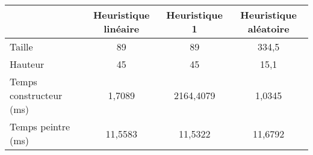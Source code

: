 \begin{center}
{\tabulinesep=1.2mm
\begin{tabu}{|l|c|c|c|}
  \hline
  & Heuristique linéaire  & Heuristique 1 & Heuristique aléatoire \\ 
  \hline
  Taille &        89&        89&     334,5  \\ 
  \hline
  Hauteur &        45&        45&      15,1  \\ 
  \hline
  Temps constructeur (ms) &          1,7089&       2164,4079&          1,0345  \\ 
  \hline
  Temps peintre (ms) &           11,5583&          11,5322&          11,6792  \\ 
  \hline
\end{tabu}
}
\end{center}

